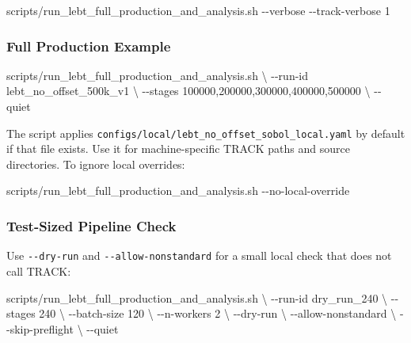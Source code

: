 \documentclass[
]{article}
\newenvironment{Shaded}{}{}
\newcommand{\AttributeTok}[1]{\textcolor[rgb]{0.49,0.56,0.16}{#1}}
\newcommand{\DataTypeTok}[1]{\textcolor[rgb]{0.56,0.13,0.00}{#1}}
\newcommand{\ExtensionTok}[1]{#1}
\newcommand{\NormalTok}[1]{#1}
\begin{document}
\begin{Shaded}
\begin{Highlighting}[]
\ExtensionTok{scripts/run\_lebt\_full\_production\_and\_analysis.sh} \AttributeTok{{-}{-}verbose} \AttributeTok{{-}{-}track{-}verbose}\NormalTok{ 1}
\end{Highlighting}
\end{Shaded}

\hypertarget{full-production-example}{%
\subsubsection{Full Production Example}\label{full-production-example}}

\begin{Shaded}
\begin{Highlighting}[]
\ExtensionTok{scripts/run\_lebt\_full\_production\_and\_analysis.sh} \DataTypeTok{\textbackslash{}}
  \AttributeTok{{-}{-}run{-}id}\NormalTok{ lebt\_no\_offset\_500k\_v1 }\DataTypeTok{\textbackslash{}}
  \AttributeTok{{-}{-}stages}\NormalTok{ 100000,200000,300000,400000,500000 }\DataTypeTok{\textbackslash{}}
  \AttributeTok{{-}{-}quiet}
\end{Highlighting}
\end{Shaded}

The script applies
\texttt{configs/local/lebt\_no\_offset\_sobol\_local.yaml} by default if
that file exists. Use it for machine-specific TRACK paths and source
directories. To ignore local overrides:

\begin{Shaded}
\begin{Highlighting}[]
\ExtensionTok{scripts/run\_lebt\_full\_production\_and\_analysis.sh} \AttributeTok{{-}{-}no{-}local{-}override}
\end{Highlighting}
\end{Shaded}

\hypertarget{test-sized-pipeline-check}{%
\subsubsection{Test-Sized Pipeline
Check}\label{test-sized-pipeline-check}}

Use \texttt{-\/-dry-run} and \texttt{-\/-allow-nonstandard} for a small
local check that does not call TRACK:

\begin{Shaded}
\begin{Highlighting}[]
\ExtensionTok{scripts/run\_lebt\_full\_production\_and\_analysis.sh} \DataTypeTok{\textbackslash{}}
  \AttributeTok{{-}{-}run{-}id}\NormalTok{ dry\_run\_240 }\DataTypeTok{\textbackslash{}}
  \AttributeTok{{-}{-}stages}\NormalTok{ 240 }\DataTypeTok{\textbackslash{}}
  \AttributeTok{{-}{-}batch{-}size}\NormalTok{ 120 }\DataTypeTok{\textbackslash{}}
  \AttributeTok{{-}{-}n{-}workers}\NormalTok{ 2 }\DataTypeTok{\textbackslash{}}
  \AttributeTok{{-}{-}dry{-}run} \DataTypeTok{\textbackslash{}}
  \AttributeTok{{-}{-}allow{-}nonstandard} \DataTypeTok{\textbackslash{}}
  \AttributeTok{{-}{-}skip{-}preflight} \DataTypeTok{\textbackslash{}}
  \AttributeTok{{-}{-}quiet}
\end{Highlighting}
\end{Shaded}
\end{document}
